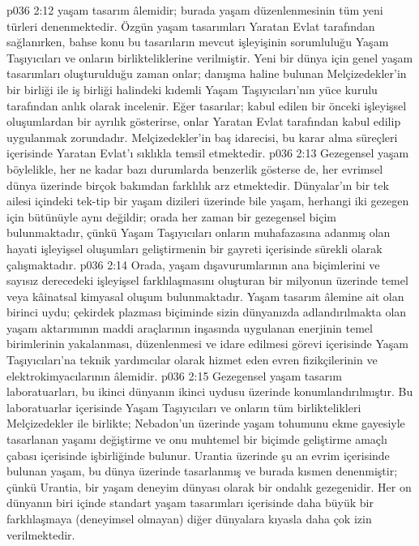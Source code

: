 \vs p036 2:12  yaşam tasarım âlemidir; burada yaşam düzenlenmesinin tüm yeni türleri denenmektedir. Özgün yaşam tasarımları Yaratan Evlat tarafından sağlanırken, bahse konu bu tasarıların mevcut işleyişinin sorumluluğu Yaşam Taşıyıcıları ve onların birlikteliklerine verilmiştir. Yeni bir dünya için genel yaşam tasarımları oluşturulduğu zaman onlar; danışma haline bulunan Melçizedekler’in bir birliği ile iş birliği halindeki kıdemli Yaşam Taşıyıcıları’nın yüce kurulu tarafından anlık olarak incelenir. Eğer tasarılar; kabul edilen bir önceki işleyişsel oluşumlardan bir ayrılık gösterirse, onlar Yaratan Evlat tarafından kabul edilip uygulanmak zorundadır. Melçizedekler’in baş idarecisi, bu karar alma süreçleri içerisinde Yaratan Evlat’ı sıklıkla temsil etmektedir.
\vs p036 2:13 Gezegensel yaşam böylelikle, her ne kadar bazı durumlarda benzerlik gösterse de, her evrimsel dünya üzerinde birçok bakımdan farklılık arz etmektedir. Dünyalar’ın bir tek ailesi içindeki tek\hyp{}tip bir yaşam dizileri üzerinde bile yaşam, herhangi iki gezegen için bütünüyle aynı değildir; orada her zaman bir gezegensel biçim bulunmaktadır, çünkü Yaşam Taşıyıcıları onların muhafazasına adanmış olan hayati işleyişsel oluşumları geliştirmenin bir gayreti içerisinde sürekli olarak çalışmaktadır.
\vs p036 2:14 Orada, yaşam dışavurumlarının ana biçimlerini ve sayısız derecedeki işleyişsel farklılaşmasını oluşturan bir milyonun üzerinde temel veya kâinatsal kimyasal oluşum bulunmaktadır. Yaşam tasarım âlemine ait olan birinci uydu; çekirdek plazması biçiminde sizin dünyanızda adlandırılmakta olan yaşam aktarımının maddi araçlarının inşasında uygulanan enerjinin temel birimlerinin yakalanması, düzenlenmesi ve idare edilmesi görevi içerisinde Yaşam Taşıyıcıları’na teknik yardımcılar olarak hizmet eden evren fizikçilerinin ve elektrokimyacılarının âlemidir.
\vs p036 2:15 Gezegensel yaşam tasarım laboratuarları, bu ikinci dünyanın ikinci uydusu üzerinde konumlandırılmıştır. Bu laboratuarlar içerisinde Yaşam Taşıyıcıları ve onların tüm birliktelikleri Melçizedekler ile birlikte; Nebadon’un  üzerinde yaşam tohumunu ekme gayesiyle tasarlanan yaşamı değiştirme ve onu muhtemel bir biçimde geliştirme amaçlı çabası içerisinde işbirliğinde bulunur. Urantia üzerinde şu an evrim içerisinde bulunan yaşam, bu dünya üzerinde tasarlanmış ve burada kısmen denenmiştir; çünkü Urantia, bir yaşam deneyim dünyası olarak bir ondalık gezegenidir. Her on dünyanın biri içinde standart yaşam tasarımları içerisinde daha büyük bir farklılaşmaya (deneyimsel olmayan) diğer dünyalara kıyasla daha çok izin verilmektedir.
